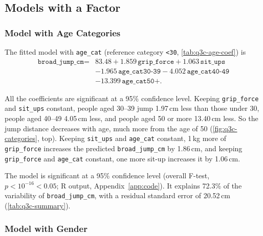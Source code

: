 \subsection{Models with a Factor}\label{sec:q3c}



\subsubsection{Model with Age Categories}\label{sec:q3c-age}

The fitted model with \texttt{age\_cat} (reference category \texttt{<30}, \autoref{tab:q3c-age-coef}) is
\begin{align*}
  \texttt{broad\_jump\_cm} = {}& 83.48 + 1.859\,\texttt{grip\_force} + 1.063\,\texttt{sit\_ups} \\
  & - 1.965\,\texttt{age\_cat30-39} - 4.052\,\texttt{age\_cat40-49} \\
  & - 13.399\,\texttt{age\_cat50+}.
\end{align*}

All the coefficients are significant at a 95\% confidence level.
Keeping \texttt{grip\_force} and \texttt{sit\_ups} constant, people aged 30--39 jump 1.97\,cm less than those under 30, people aged 40--49 4.05\,cm less, and people aged 50 or more 13.40\,cm less.
So the jump distance decreases with age, much more from the age of 50 (\autoref{fig:q3c-categories}, top).
Keeping \texttt{sit\_ups} and \texttt{age\_cat} constant, 1\,kg more of \texttt{grip\_force} increases the predicted \texttt{broad\_jump\_cm} by 1.86\,cm, and keeping \texttt{grip\_force} and \texttt{age\_cat} constant, one more sit-up increases it by 1.06\,cm.


The model is significant at a 95\% confidence level (overall F-test, $p < 10^{-16} < 0.05$; R output, Appendix~\ref{app:code}).
It explains 72.3\% of the variability of \texttt{broad\_jump\_cm}, with a residual standard error of 20.52\,cm (\autoref{tab:q3c-summary}).

\subsubsection{Model with Gender}\label{sec:q3c-gender}

